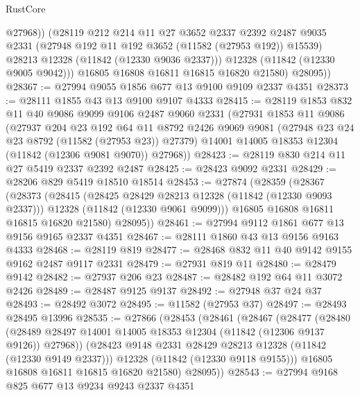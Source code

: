 \begin{lexlean}{RustCore}
\begin{coremodule}
                @27968))
            (@28119
              @212
              @214
              @11
              @27
              @3652
              @2337
              @2392
              @2487
              @9035
              @2331
              (@27948 @192 @11 @192 @3652 (@11582 (@27953 @192)) @15539)
              @28213
              @12328
              (@11842 (@12330 @9036 @2337)))
            @12328
            (@11842 (@12330 @9005 @9042)))
          @16805
          @16808
          @16811
          @16815
          @16820
          @21580)
        @28095))
@28367 := @27994 @9055 @1856 @677 @13 @9100 @9109 @2337 @4351
@28373 := @28111 @1855 @43 @13 @9100 @9107 @4333
@28415 := @28119
    @1853
    @832
    @11
    @40
    @9086
    @9099
    @9106
    @2487
    @9060
    @2331
    (@27931
      @1853
      @11
      @9086
      (@27937
        @204
        @23
        @192
        @64
        @11
        @8792
        @2426
        @9069
        @9081
        (@27948 @23 @24 @23 @8792 (@11582 (@27953 @23)) @27379)
        @14001
        @14005
        @18353
        @12304
        (@11842 (@12306 @9081 @9070))
        @27968))
@28423 := @28119 @830 @214 @11 @27 @5419 @2337 @2392 @2487
@28425 := @28423 @9092 @2331
@28429 := @28206 @829 @5419 @18510 @18514
@28453 := @27874
    (@28359
      (@28367
        (@28373
          (@28415
            (@28425 @28429 @28213 @12328 (@11842 (@12330 @9093 @2337)))
            @12328
            (@11842 (@12330 @9061 @9099)))
          @16805
          @16808
          @16811
          @16815
          @16820
          @21580)
        @28095))
@28461 := @27994 @9112 @1861 @677 @13 @9156 @9165 @2337 @4351
@28467 := @28111 @1860 @43 @13 @9156 @9163 @4333
@28468 := @28119 @819
@28477 := @28468 @832 @11 @40 @9142 @9155 @9162 @2487 @9117 @2331
@28479 := @27931 @819 @11
@28480 := @28479 @9142
@28482 := @27937 @206 @23
@28487 := @28482 @192 @64 @11 @3072 @2426
@28489 := @28487 @9125 @9137
@28492 := @27948 @37 @24 @37
@28493 := @28492 @3072
@28495 := @11582 (@27953 @37)
@28497 := @28493 @28495 @13996
@28535 := @27866
    (@28453
      (@28461
        (@28467
          (@28477
            (@28480
              (@28489 @28497 @14001 @14005 @18353 @12304 (@11842 (@12306 @9137 @9126)) @27968))
            (@28423 @9148 @2331 @28429 @28213 @12328 (@11842 (@12330 @9149 @2337)))
            @12328
            (@11842 (@12330 @9118 @9155)))
          @16805
          @16808
          @16811
          @16815
          @16820
          @21580)
        @28095))
@28543 := @27994 @9168 @825 @677 @13 @9234 @9243 @2337 @4351

\end{coremodule}
\end{lexlean}
